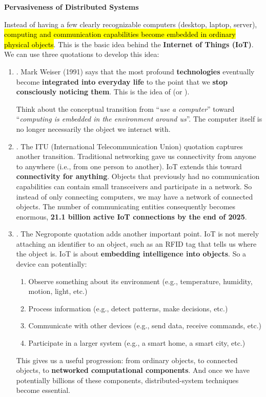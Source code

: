 \highspace
\begin{flushleft}
    \textcolor{Red2}{ \textbf{Pervasiveness of Distributed Systems}}
\end{flushleft}
Instead of having a few clearly recognizable computers (desktop, laptop, server), \hl{computing and communication capabilities become embedded in ordinary physical objects}. This is the basic idea behind the \textbf{Internet of Things (IoT)}. We can use three quotations to develop this idea:
\begin{enumerate}
    \item {}. Mark Weiser (1991) says that the most profound \textbf{technologies} eventually become \textbf{integrated into everyday life} to the point that we \textbf{stop consciously noticing them}. This is the idea of  (or ).

        Think about the conceptual transition from ``\emph{use a computer}'' toward ``\emph{computing is embedded in the environment around us}''. The computer itself is no longer necessarily the object we interact with.

    \item {}. The ITU (International Telecommunication Union) quotation captures another transition. Traditional networking gave us connectivity from anyone to anywhere (i.e., from one person to another). IoT extends this toward \textbf{connectivity for anything}. Objects that previously had no communication capabilities can contain small transceivers and participate in a network. So instead of only connecting computers, we may have a network of connected objects. The number of communicating entities consequently becomes enormous, \textbf{21.1 billion active IoT connections by the end of 2025}.

        \newpage

    \item {}. The Negroponte quotation adds another important point. IoT is not merely attaching an identifier to an object, such as an RFID tag that tells us where the object is. IoT is about \textbf{embedding intelligence into objects}. So a device can potentially:
        \begin{enumerate}
            \item Observe something about its environment (e.g., temperature, humidity, motion, light, etc.)
            \item Process information (e.g., detect patterns, make decisions, etc.)
            \item Communicate with other devices (e.g., send data, receive commands, etc.)
            \item Participate in a larger system (e.g., a smart home, a smart city, etc.)
        \end{enumerate}
        This gives us a useful progression: from ordinary objects, to connected objects, to \textbf{networked computational components}. And once we have potentially billions of these components, distributed-system techniques become essential.
\end{enumerate}

